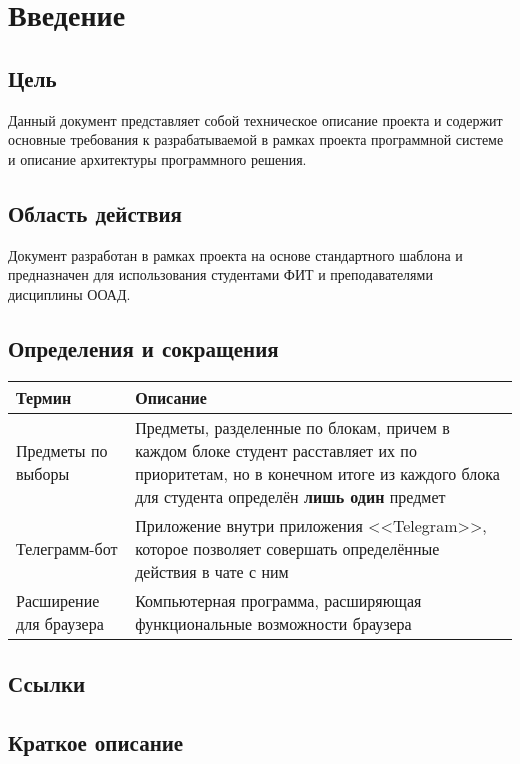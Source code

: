 \chapter{Введение}
	\section{Цель}
		Данный документ представляет собой техническое описание проекта \ProjectName и содержит основные требования к разрабатываемой в рамках проекта программной системе и описание архитектуры программного решения.
	\section{Область действия}
		Документ разработан в рамках проекта \ProjectName на основе стандартного шаблона и предназначен для использования студентами ФИТ и преподавателями дисциплины ООАД.
	\section{Определения и сокращения}
		\begin{tabularx}{\textwidth}{
				| >{\centering\arraybackslash\hsize=5cm}X
				| >{\centering\arraybackslash}X
				|}\hline
			\textbf{Термин} & \textbf{Описание} \\\hline
			Предметы по выборы & Предметы, разделенные по блокам, причем в каждом блоке студент расставляет их по приоритетам, но в конечном итоге из каждого блока для студента определён \textbf{лишь один} предмет \\\hline
			Телеграмм-бот & Приложение внутри приложения <<Telegram>>, которое позволяет совершать определённые действия в чате с ним \\\hline
			Расширение для браузера & Компьютерная программа, расширяющая функциональные возможности браузера \\\hline
		\end{tabularx}
	\section{Ссылки}

	\section{Краткое описание}
